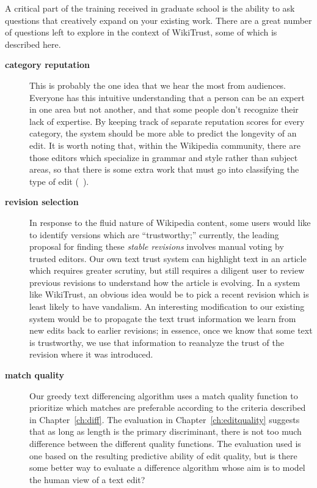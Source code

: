 A critical part of the training received in graduate school
is the ability to ask questions that creatively expand on your
existing work.
There are a great number of questions left to explore in the
context of WikiTrust, some of which is described here.

\begin{description}
\item[\textbf{category reputation}]
    This is probably the one idea that we hear the most from audiences.
    Everyone has this intuitive understanding that a person can be
    an expert in one area but not another, and that some people don't
    recognize their lack of expertise.
    By keeping track of separate reputation scores for every category,
    the system should be more able to predict the longevity of an edit.
    It is worth noting that, within the Wikipedia community, there
    are those editors which specialize in grammar and style rather than
    subject areas, so that there is some extra work that must go
    into classifying the type of edit (\eg~\cite{Fong2010}).

\item[\textbf{revision selection}]
   In response to the fluid nature of Wikipedia content,
    some users would like to identify versions which
    are ``trustworthy;'' currently, the leading proposal
    for finding these \textit{stable revisions}
    involves manual voting by trusted editors.
    Our own text trust system can highlight text in
    an article which requires greater scrutiny, but
    still requires a diligent user to review previous
    revisions to understand how the article is evolving.
    In a system like WikiTrust, an obvious idea would be to pick
    a recent revision which is least likely to have vandalism.
    An interesting modification to our existing system would be
    to propagate the text trust information we learn from new edits
    back to earlier revisions; in essence, once we know that some
    text is trustworthy, we use that information to reanalyze the
    trust of the revision where it was introduced.

\item[\textbf{match quality}] Our greedy text differencing algorithm
    uses a match quality function to prioritize which matches are
    preferable according to the criteria described in Chapter~\ref{ch:diff}.
    The evaluation in Chapter~\ref{ch:editquality}
    suggests that as long as length
    is the primary discriminant, there is not too much difference
    between the different quality functions.
    The evaluation used is one based on the resulting predictive ability
    of edit quality, but is there some better way to evaluate a difference
    algorithm whose aim is to model the human view of a text edit?


\end{description}
